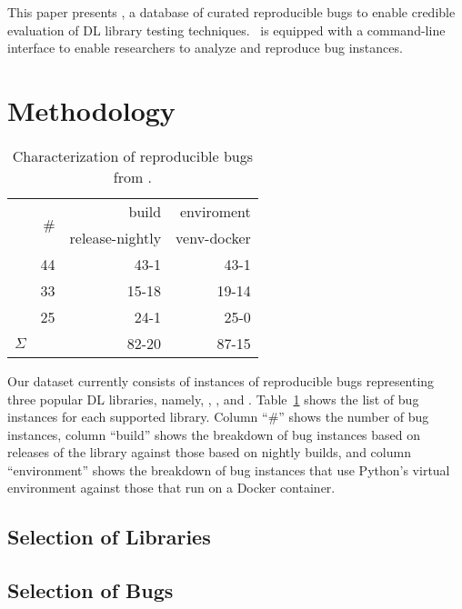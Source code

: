 \documentclass[sigconf]{acmart}
\begin{document}
This paper presents \tname, a database of curated reproducible bugs to
enable credible evaluation of DL library testing techniques. \tname\ is
equipped with a command-line interface to enable researchers to analyze
and reproduce bug instances.


\section{Methodology}

\begin{table}
  \centering
  \label{table:bug-characterization}
  \caption{Characterization of reproducible bugs from \tname.}
\begin{tabular}{l|rrr}
  \toprule
  & \multirow{2}{*}{\#} &  \multicolumn{1}{r}{build}          &   \multicolumn{1}{r}{enviroment}  \\
  &   & release-nightly &  venv-docker  \\
  \cmidrule(lr){2-4}
  \jax{} & 44 & 43-1 &  43-1 \\
  \torch{} & 33 & 15-18 & 19-14 \\
  \tf{} & 25 & 24-1 & 25-0 \\
  \midrule
  \multicolumn{1}{c|}{$\Sigma$} & \numbugs{} & 82-20 & 87-15 \\
  \bottomrule
\end{tabular}
\end{table}


Our dataset currently consists of \numbugs{} instances of reproducible
bugs representing three popular DL libraries, namely, \jax, \tf, and
\torch. Table~\ref{table:bug-characterization} shows the list of bug
instances for each supported library. Column ``\#'' shows the number
of bug instances, column ``build'' shows the breakdown of bug
instances based on releases of the library against those based on
nightly builds, and column ``environment'' shows the breakdown of bug
instances that use Python's virtual environment against those that run
on a Docker container.

\subsection{Selection of Libraries}


\subsection{Selection of Bugs}
\end{document}
